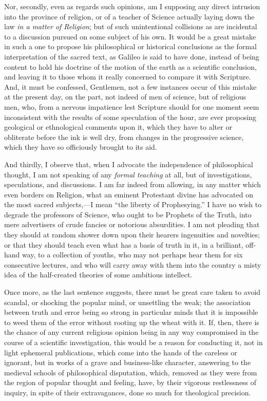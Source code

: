 Nor, secondly, even as regards such opinions, am I supposing any
direct intrusion into the province of religion, or of a teacher of
Science actually laying down the law \emph{in a matter of Religion};
but of such unintentional collisions as are incidental to a discussion
pursued on some subject of his own. It would be a great mistake in
such a one to propose his philosophical or historical conclusions as
the formal interpretation of the sacred text, as Galileo is said to
have done, instead of being content to hold his doctrine of the motion
of the earth as a scientific conclusion, and leaving it to those whom
it really concerned to compare it with Scripture. And, it must be
confessed, Gentlemen, not a few instances occur of this mistake at the
present day, on the part, not indeed of men of science, but of
religious men, who, from a nervous impatience lest Scripture should
for one moment seem inconsistent with the results of some speculation
of the hour, are ever proposing geological or ethnological comments
upon it, which they have to alter or obliterate before the ink is well
dry, from changes in the progressive science, which they have so
officiously brought to its aid.

And thirdly, I observe that, when I advocate the independence of
philosophical thought, I am not speaking of any \emph{formal teaching}
at all, but of investigations, speculations, and discussions. I am far
indeed from allowing, in any matter which even borders on Religion,
what an eminent Protestant divine has advocated on the most sacred
subjects,—I mean ``the liberty of Prophesying.'' I have no
wish to degrade the professors of Science, who ought to be Prophets of
the Truth, into mere advertisers of crude fancies or notorious
absurdities. I am not pleading that they should at random shower down
upon their hearers ingenuities and novelties; or that they
should teach even what has a basis of truth in it, in a brilliant,
off-hand way, to a collection of youths, who may not perhaps hear them
for six consecutive lectures, and who will carry away with them into
the country a misty idea of the half-created theories of some
ambitious intellect.

Once more, as the last sentence suggests, there must be great care
taken to avoid scandal, or shocking the popular mind, or unsettling
the weak; the association between truth and error being so strong in
particular minds that it is impossible to weed them of the error
without rooting up the wheat with it. If, then, there is the chance of
any current religious opinion being in any way compromised in the
course of a scientific investigation, this would be a reason for
conducting it, not in light ephemeral publications, which come into
the hands of the careless or ignorant, but in works of a grave and
business-like character, answering to the medieval schools of
philosophical disputation, which, removed as they were from the region
of popular thought and feeling, have, by their vigorous restlessness
of inquiry, in spite of their extravagances, done so much for
theological precision.

